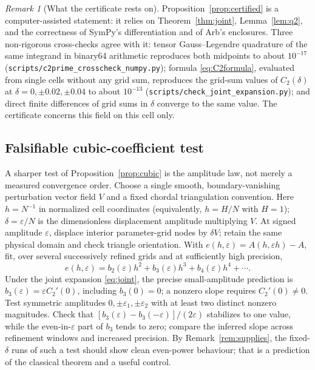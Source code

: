 \documentclass[11pt]{article}
\theoremstyle{remark}
\newtheorem{remark}{Remark}
\begin{document}
\begin{remark}[What the certificate rests on]
\sloppy Proposition~\ref{prop:certified} is a computer-assisted statement: it relies on
Theorem~\ref{thm:joint}, Lemma~\ref{lem:q2}, and the correctness of SymPy's differentiation
and of Arb's enclosures. Three non-rigorous cross-checks agree with it: tensor
Gauss--Legendre quadrature of the same integrand in binary64 arithmetic reproduces both
midpoints to about $10^{-17}$ (\texttt{scripts/c2prime\_crosscheck\_numpy.py}); formula
\eqref{eq:C2formula}, evaluated from single cells without any grid sum, reproduces the
grid-sum values of $C_2(\delta)$ at $\delta=0,\pm0.02,\pm0.04$ to about $10^{-13}$
(\texttt{scripts/check\_joint\_expansion.py}); and direct finite differences of grid sums in
$\delta$ converge to the same value. The certificate concerns this field on this cell only.
\end{remark}

\subsection{Falsifiable cubic-coefficient test}
A sharper test of Proposition~\ref{prop:cubic} is the amplitude law, not merely a measured
convergence order. Choose a single smooth, boundary-vanishing perturbation vector field $V$
and a fixed chordal triangulation convention. Here $h=N^{-1}$ in normalized cell coordinates
(equivalently, $h=H/N$ with $H=1$); $\delta=\varepsilon/N$ is the dimensionless displacement
amplitude multiplying $V$. At signed amplitude $\varepsilon$, displace interior parameter-grid
nodes by $\delta V$; retain the same physical domain and check triangle orientation. With
$e(h,\varepsilon)=A(h,\varepsilon h)-A$, fit, over several successively refined grids and at
sufficiently high precision,
\begin{equation}\label{eq:fit}
e(h,\varepsilon)=b_2(\varepsilon)h^2+b_3(\varepsilon)h^3+b_4(\varepsilon)h^4+\cdots .
\end{equation}
Under the joint expansion \eqref{eq:joint}, the precise small-amplitude prediction is
$b_3(\varepsilon)=\varepsilon C_2'(0)$, including $b_3(0)=0$; a nonzero slope requires
$C_2'(0)\neq0$. Test symmetric amplitudes $0,\pm\varepsilon_1,\pm\varepsilon_2$ with at least
two distinct nonzero magnitudes. Check that
$[b_3(\varepsilon)-b_3(-\varepsilon)]/(2\varepsilon)$ stabilizes to one value, while the
even-in-$\varepsilon$ part of $b_3$ tends to zero; compare the inferred slope across
refinement windows and increased precision. By Remark~\ref{rem:supplies}, the fixed-$\delta$
runs of such a test should show clean even-power behaviour; that is a prediction of the
classical theorem and a useful control.
\end{document}
